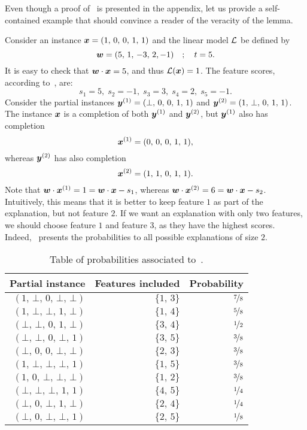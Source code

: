 Even though a proof of~ is presented in the appendix, let us provide a self-contained example that should convince a reader of the veracity of the lemma.
\begin{example}\label{ex:greedy}
 Consider an instance ${\bm{x}} = (1,\, 0, \, 0, \, 1, \, 1)$ and the linear model $\mathcal{L}$ be defined by 
 \[ 
    {\bm{w}} = (5, \, 1, \, -3,\, 2, -1) \quad ; \quad t = 5.
 \]
 It is easy to check that ${\bm{w}} \cdot {\bm{x}} = 5$, and thus $\mathcal{L}({\bm{x}}) = 1$. The feature scores, according to~, are:
 \[
  s_1 = 5, \; s_2 = -1, \; s_3 = 3, \; s_4 = 2, \; s_5 = -1.
 \]
Consider the partial instances ${\bm{y}}^{(1)} = (\bot, \, 0, \, 0, \, 1, \, 1)$ and ${\bm{y}}^{(2)} = (1, \, \bot, \, 0, \, 1, \, 1)$. The instance ${\bm{x}}$ is a completion of both ${\bm{y}}^{(1)}$ and ${\bm{y}}^{(2)}$, but ${\bm{y}}^{(1)}$ also has completion 
\[
    {\bm{x}}^{(1)} = (0, \, 0, \, 0, \, 1, \, 1),
\]
whereas ${\bm{y}}^{(2)}$ has also completion 
\[
    {\bm{x}}^{(2)} = (1, \, 1, \, 0, \, 1, \, 1).
\]
Note that ${\bm{w}} \cdot  {\bm{x}}^{(1)} = 1 = {\bm{w}} \cdot {\bm{x}} - s_1$, whereas ${\bm{w}} \cdot  {\bm{x}}^{(2)} = 6 = {\bm{w}} \cdot {\bm{x}} - s_2$. Intuitively, this means that it is better to keep feature $1$ as part of the explanation, but not feature $2$. If we want an explanation with only two features, we should choose feature $1$ and feature $3$, as they have the highest scores. Indeed,~ presents the probabilities to all possible explanations of size $2$.
\begin{table}
    \caption{Table of probabilities associated to~.}\label{table:ex-greedy}
    \centering
    \begin{tabular}{rrr}
        \toprule
        Partial instance & Features included & Probability\\ \midrule 
    $(1, \,\bot, \,0, \,\bot, \,\bot)$ & $\{1, \,3\}$ & $\nicefrac{ 7 }{ 8 }$\\
    $(1, \,\bot, \,\bot, \,1, \,\bot)$ & $\{1, \,4\}$ & $\nicefrac{ 5 }{ 8 }$\\
    $(\bot, \,\bot, \,0, \,1, \,\bot)$ & $\{3, \,4\}$ & $\nicefrac{ 1 }{ 2 }$\\
    $(\bot, \,\bot, \,0, \,\bot, \,1)$ & $\{3, \,5\}$ & $\nicefrac{ 3 }{ 8 }$\\
    $(\bot, \,0, \,0, \,\bot, \,\bot)$ & $\{2, \,3\}$ & $\nicefrac{ 3 }{ 8 }$\\
    $(1, \,\bot, \,\bot, \,\bot, \,1)$ & $\{1, \,5\}$ & $\nicefrac{ 3 }{ 8 }$\\
    $(1, \,0, \,\bot, \,\bot, \,\bot)$ & $\{1, \,2\}$ & $\nicefrac{ 3 }{ 8 }$\\
    $(\bot, \,\bot, \,\bot, \,1, \,1)$ & $\{4, \,5\}$ & $\nicefrac{ 1 }{ 4 }$\\
    $(\bot, \,0, \,\bot, \,1, \,\bot)$ & $\{2, \,4\}$ & $\nicefrac{ 1 }{ 4 }$\\
    $(\bot, \,0, \,\bot, \,\bot, \,1)$ & $\{2, \,5\}$ & $\nicefrac{ 1 }{ 8 }$\\
        \bottomrule
    \end{tabular}
\end{table}
\end{example}

